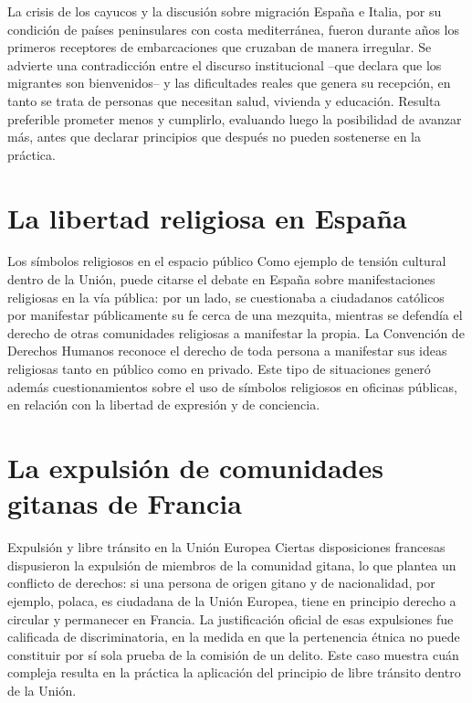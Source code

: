 \documentclass[12pt,oneside]{book}
\begin{document}
\begin{ejemplo}{La crisis de los cayucos y la discusión sobre migración}
España e Italia, por su condición de países peninsulares con costa mediterránea, fueron durante años los primeros receptores de embarcaciones que cruzaban de manera irregular. Se advierte una contradicción entre el discurso institucional --que declara que los migrantes son bienvenidos-- y las dificultades reales que genera su recepción, en tanto se trata de personas que necesitan salud, vivienda y educación. Resulta preferible prometer menos y cumplirlo, evaluando luego la posibilidad de avanzar más, antes que declarar principios que después no pueden sostenerse en la práctica.
\end{ejemplo}

\section{La libertad religiosa en España}

\begin{ejemplo}{Los símbolos religiosos en el espacio público}
Como ejemplo de tensión cultural dentro de la Unión, puede citarse el debate en España sobre manifestaciones religiosas en la vía pública: por un lado, se cuestionaba a ciudadanos católicos por manifestar públicamente su fe cerca de una mezquita, mientras se defendía el derecho de otras comunidades religiosas a manifestar la propia. La Convención de Derechos Humanos reconoce el derecho de toda persona a manifestar sus ideas religiosas tanto en público como en privado. Este tipo de situaciones generó además cuestionamientos sobre el uso de símbolos religiosos en oficinas públicas, en relación con la libertad de expresión y de conciencia.
\end{ejemplo}

\section{La expulsión de comunidades gitanas de Francia}

\begin{ejemplo}{Expulsión y libre tránsito en la Unión Europea}
Ciertas disposiciones francesas dispusieron la expulsión de miembros de la comunidad gitana, lo que plantea un conflicto de derechos: si una persona de origen gitano y de nacionalidad, por ejemplo, polaca, es ciudadana de la Unión Europea, tiene en principio derecho a circular y permanecer en Francia. La justificación oficial de esas expulsiones fue calificada de discriminatoria, en la medida en que la pertenencia étnica no puede constituir por sí sola prueba de la comisión de un delito. Este caso muestra cuán compleja resulta en la práctica la aplicación del principio de libre tránsito dentro de la Unión.
\end{ejemplo}
\end{document}
